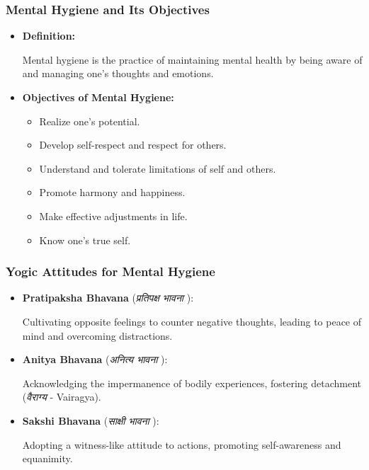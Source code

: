 \begin{frame}[fragile]\frametitle{Mental Hygiene and Its Objectives}

      \begin{itemize}
        \item \textbf{Definition:}
        
        Mental hygiene is the practice of maintaining mental health by being aware of and managing one's thoughts and emotions.
        
        \item \textbf{Objectives of Mental Hygiene:}
        \begin{itemize}
            \item Realize one's potential.
            \item Develop self-respect and respect for others.
            \item Understand and tolerate limitations of self and others.
            \item Promote harmony and happiness.
            \item Make effective adjustments in life.
            \item Know one's true self.
        \end{itemize}
      \end{itemize}

\end{frame}

\begin{frame}[fragile]\frametitle{Yogic Attitudes for Mental Hygiene}

      \begin{itemize}
        \item \textbf{Pratipaksha Bhavana} (\textit{प्रतिपक्ष भावना }):
        
        Cultivating opposite feelings to counter negative thoughts, leading to peace of mind and overcoming distractions.
        
        \item \textbf{Anitya Bhavana} (\textit{अनित्य भावना }):
        
        Acknowledging the impermanence of bodily experiences, fostering detachment (\textit{वैराग्य} - Vairagya).
        
        \item \textbf{Sakshi Bhavana} (\textit{साक्षी भावना }):
        
        Adopting a witness-like attitude to actions, promoting self-awareness and equanimity.
        
      \end{itemize}

\end{frame}

